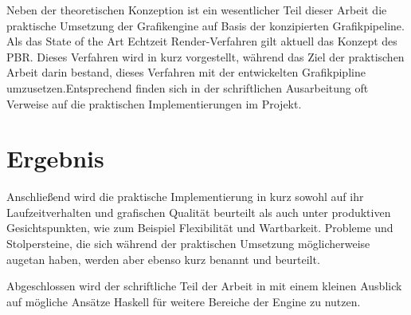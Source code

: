 Neben der theoretischen Konzeption ist ein wesentlicher Teil dieser Arbeit die praktische Umsetzung der Grafikengine auf Basis der konzipierten Grafikpipeline. Als das State of the Art Echtzeit Render-Verfahren gilt aktuell das Konzept des \ac{PBR}. Dieses Verfahren wird in  kurz vorgestellt, während das Ziel der praktischen Arbeit darin bestand, dieses Verfahren mit der entwickelten Grafikpipline umzusetzen.Entsprechend finden sich in der schriftlichen Ausarbeitung oft Verweise auf die praktischen Implementierungen im Projekt.

\section{Ergebnis}
Anschließend wird die praktische Implementierung in  kurz sowohl auf ihr Laufzeitverhalten und grafischen Qualität beurteilt als auch unter produktiven Gesichtspunkten, wie zum Beispiel Flexibilität und Wartbarkeit. Probleme und Stolpersteine, die sich während der praktischen Umsetzung möglicherweise augetan haben, werden aber ebenso kurz benannt und beurteilt.

Abgeschlossen wird der schriftliche Teil der Arbeit in  mit einem kleinen Ausblick auf mögliche Ansätze Haskell für weitere Bereiche der Engine zu nutzen.
